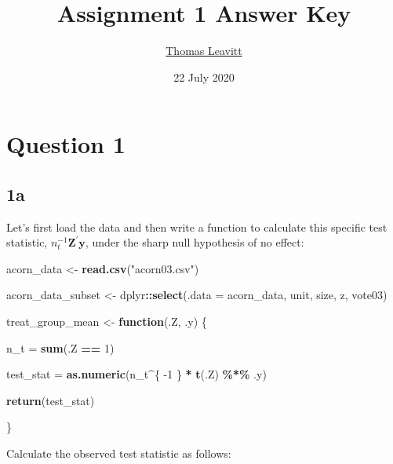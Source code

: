 \documentclass[
  12pt,
  leqno]{article}
\title{Assignment 1 Answer Key}
\author{\href{mailto:tl2624@columbia.edu}{Thomas Leavitt}}
\date{22 July 2020}
\newenvironment{Shaded}{\begin{snugshade}}{\end{snugshade}}
\newcommand{\ControlFlowTok}[1]{\textcolor[rgb]{0.13,0.29,0.53}{\textbf{#1}}}
\newcommand{\DataTypeTok}[1]{\textcolor[rgb]{0.13,0.29,0.53}{#1}}
\newcommand{\DecValTok}[1]{\textcolor[rgb]{0.00,0.00,0.81}{#1}}
\newcommand{\KeywordTok}[1]{\textcolor[rgb]{0.13,0.29,0.53}{\textbf{#1}}}
\newcommand{\NormalTok}[1]{#1}
\newcommand{\OperatorTok}[1]{\textcolor[rgb]{0.81,0.36,0.00}{\textbf{#1}}}
\newcommand{\StringTok}[1]{\textcolor[rgb]{0.31,0.60,0.02}{#1}}
\begin{document}
\maketitle

\section*{Question 1}

\subsection*{1a}

Let's first load the data and then write a function to calculate this
specific test statistic, \(n_t^{-1}\mathbf{Z}^{\prime}\mathbf{y}\),
under the sharp null hypothesis of no effect:

\scriptsize

\begin{Shaded}
\begin{Highlighting}[]
\NormalTok{acorn\_data \textless{}{-}}\StringTok{ }\KeywordTok{read.csv}\NormalTok{(}\StringTok{"acorn03.csv"}\NormalTok{)}

\NormalTok{acorn\_data\_subset \textless{}{-}}\StringTok{ }\NormalTok{dplyr}\OperatorTok{::}\KeywordTok{select}\NormalTok{(}\DataTypeTok{.data =}\NormalTok{ acorn\_data, unit, size, z, vote03)}

\NormalTok{treat\_group\_mean \textless{}{-}}\StringTok{ }\ControlFlowTok{function}\NormalTok{(.Z, .y) \{}
    
\NormalTok{    n\_t =}\StringTok{ }\KeywordTok{sum}\NormalTok{(.Z }\OperatorTok{==}\StringTok{ }\DecValTok{1}\NormalTok{)}
    
\NormalTok{    test\_stat =}\StringTok{ }\KeywordTok{as.numeric}\NormalTok{(n\_t}\OperatorTok{\^{}}\NormalTok{\{}
        \DecValTok{{-}1}
\NormalTok{    \} }\OperatorTok{*}\StringTok{ }\KeywordTok{t}\NormalTok{(.Z) }\OperatorTok{\%*\%}\StringTok{ }\NormalTok{.y)}
    
    \KeywordTok{return}\NormalTok{(test\_stat)}
    
\NormalTok{\}}
\end{Highlighting}
\end{Shaded}

\normalsize

Calculate the observed test statistic as follows: \scriptsize

\begin{Shaded}
\end{Shaded}
\end{document}
